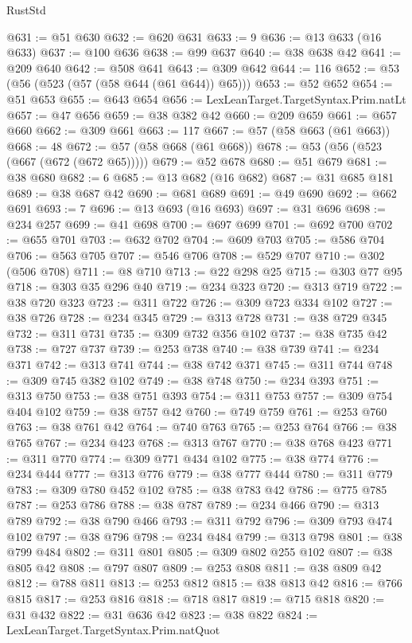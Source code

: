 \begin{lexlean}{RustStd}
\begin{coremodule}
@631 := @51 @630
@632 := @620 @631
@633 := 9
@636 := @13 @633 (@16 @633)
@637 := @100 @636
@638 := @99 @637
@640 := @38 @638 @42
@641 := @209 @640
@642 := @508 @641
@643 := @309 @642
@644 := 116
@652 := @53 (@56 (@523 (@57 (@58 @644 (@61 @644)) @65)))
@653 := @52 @652
@654 := @51 @653
@655 := @643 @654
@656 := LexLeanTarget.TargetSyntax.Prim.natLt
@657 := @47 @656
@659 := @38 @382 @42
@660 := @209 @659
@661 := @657 @660
@662 := @309 @661
@663 := 117
@667 := @57 (@58 @663 (@61 @663))
@668 := 48
@672 := @57 (@58 @668 (@61 @668))
@678 := @53 (@56 (@523 (@667 (@672 (@672 @65)))))
@679 := @52 @678
@680 := @51 @679
@681 := @38 @680
@682 := 6
@685 := @13 @682 (@16 @682)
@687 := @31 @685 @181
@689 := @38 @687 @42
@690 := @681 @689
@691 := @49 @690
@692 := @662 @691
@693 := 7
@696 := @13 @693 (@16 @693)
@697 := @31 @696
@698 := @234 @257
@699 := @41 @698
@700 := @697 @699
@701 := @692 @700
@702 := @655 @701
@703 := @632 @702
@704 := @609 @703
@705 := @586 @704
@706 := @563 @705
@707 := @546 @706
@708 := @529 @707
@710 := @302 (@506 @708)
@711 := @8 @710
@713 := @22 @298 @25
@715 := @303 @77 @95
@718 := @303 @35 @296 @40
@719 := @234 @323
@720 := @313 @719
@722 := @38 @720 @323
@723 := @311 @722
@726 := @309 @723 @334 @102
@727 := @38 @726
@728 := @234 @345
@729 := @313 @728
@731 := @38 @729 @345
@732 := @311 @731
@735 := @309 @732 @356 @102
@737 := @38 @735 @42
@738 := @727 @737
@739 := @253 @738
@740 := @38 @739
@741 := @234 @371
@742 := @313 @741
@744 := @38 @742 @371
@745 := @311 @744
@748 := @309 @745 @382 @102
@749 := @38 @748
@750 := @234 @393
@751 := @313 @750
@753 := @38 @751 @393
@754 := @311 @753
@757 := @309 @754 @404 @102
@759 := @38 @757 @42
@760 := @749 @759
@761 := @253 @760
@763 := @38 @761 @42
@764 := @740 @763
@765 := @253 @764
@766 := @38 @765
@767 := @234 @423
@768 := @313 @767
@770 := @38 @768 @423
@771 := @311 @770
@774 := @309 @771 @434 @102
@775 := @38 @774
@776 := @234 @444
@777 := @313 @776
@779 := @38 @777 @444
@780 := @311 @779
@783 := @309 @780 @452 @102
@785 := @38 @783 @42
@786 := @775 @785
@787 := @253 @786
@788 := @38 @787
@789 := @234 @466
@790 := @313 @789
@792 := @38 @790 @466
@793 := @311 @792
@796 := @309 @793 @474 @102
@797 := @38 @796
@798 := @234 @484
@799 := @313 @798
@801 := @38 @799 @484
@802 := @311 @801
@805 := @309 @802 @255 @102
@807 := @38 @805 @42
@808 := @797 @807
@809 := @253 @808
@811 := @38 @809 @42
@812 := @788 @811
@813 := @253 @812
@815 := @38 @813 @42
@816 := @766 @815
@817 := @253 @816
@818 := @718 @817
@819 := @715 @818
@820 := @31 @432
@822 := @31 @636 @42
@823 := @38 @822
@824 := LexLeanTarget.TargetSyntax.Prim.natQuot

\end{coremodule}
\end{lexlean}
